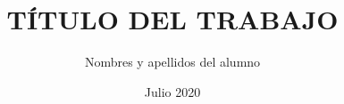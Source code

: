 \documentclass[a4paper, 12pt, oneside]{tesisutec}
\begin{document}
\frontmatter
{}
\title {TÍTULO DEL TRABAJO}
\author{Nombres y apellidos del alumno}
\date{Julio 2020}

\maketitle
{}





\tableofcontents
\newpage
\listoftables
\newpage
\listoffigures


\mainmatter
\pagestyle{fancy}








% 

\renewcommand{\bibname}{\large\bf{REFERENCIAS BIBLIOGR\'AFICAS}}
\end{document}
